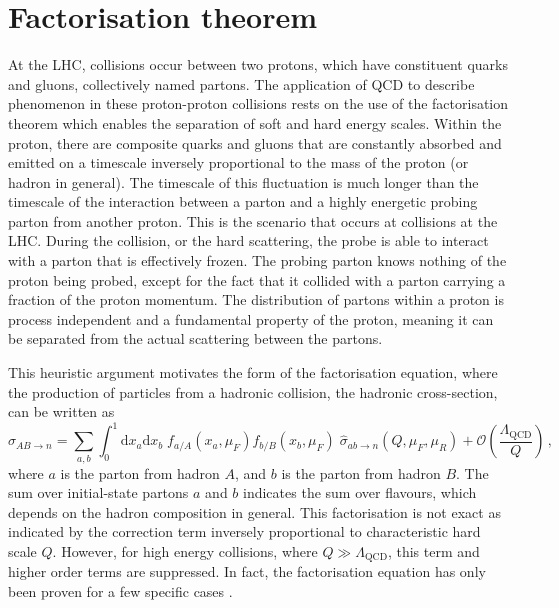 \documentclass[main.tex]{subfiles}
\begin{document}
\section{Factorisation theorem}\label{sec:factorisation}
    At the LHC, collisions occur between two protons,
    which have constituent quarks and gluons, collectively
    named partons.
    The application of QCD to describe phenomenon
    in these proton-proton collisions rests on the use of
    the factorisation theorem which enables the
    separation of soft and hard energy scales.
    Within the proton, there are composite quarks
    and gluons that are constantly absorbed and
    emitted on a timescale inversely proportional
    to the mass of the proton (or hadron in general).
    The timescale of this fluctuation is much longer
    than the timescale of the interaction between
    a parton and a highly energetic probing parton
    from another proton. This is the scenario
    that occurs at collisions at the LHC.
    During the collision, or the hard scattering,
    the probe is able to interact with a
    parton that is effectively frozen.
    The probing parton knows nothing of the
    proton being probed, except for the fact
    that it collided with a parton carrying
    a fraction of the proton momentum. The
    distribution of partons within a proton
    is process independent and a fundamental
    property of the proton, meaning it can be
    separated from the actual scattering between
    the partons.

    This heuristic argument motivates the form of
    the factorisation equation, where the production of
    particles from a hadronic collision, the hadronic
    cross-section, can be written as
    \begin{equation}\label{eqn:hadronic_cs}
        \sigma_{AB \rightarrow n} = \sum_{a, b}\int_{0}^{1} \mathrm{d}x_{a}\mathrm{d}x_{b} \; f_{a/A}(x_{a},\mu_{F})f_{b/B}(x_{b}, \mu_{F}) \; \hat{\sigma}_{ab \rightarrow n}(Q, \mu_{F}, \mu_{R}) + \mathcal{O}\left(\dfrac{\Lambda_{\mathrm{QCD}}}{Q}\right)\, ,
    \end{equation}
    where $a$ is the parton from hadron $A$,
    and $b$ is the parton from hadron $B$.
    The sum over initial-state partons $a$ and $b$
    indicates the sum over flavours, which depends
    on the hadron composition in general.
    This factorisation is not exact as indicated by the
    correction term inversely proportional to characteristic
    hard scale $Q$. However, for high energy collisions, where
    $Q \gg \Lambda_{\mathrm{QCD}}$, this term and higher order
    terms are suppressed.
    In fact, the factorisation equation has only been
    proven for a few specific cases \cite{Collins:2011zzd,Collins:1987pm,Collins:1989gx,Amoroso:2022eow}.
\end{document}
